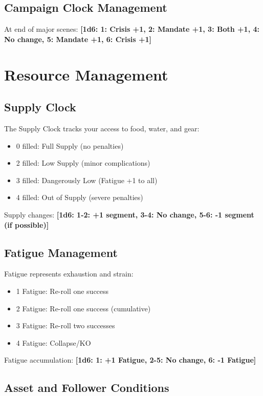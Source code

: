 \documentclass[11pt]{article}
\newcommand{\dice}[1]{\textbf{[1d6: #1]}}
\begin{document}
\subsection{Campaign Clock Management}

At end of major scenes:
\dice{1: Crisis +1, 2: Mandate +1, 3: Both +1, 4: No change, 5: Mandate +1, 6: Crisis +1}

\section{Resource Management}

\subsection{Supply Clock}

The Supply Clock tracks your access to food, water, and gear:
\begin{itemize}
    \item 0 filled: Full Supply (no penalties)
    \item 2 filled: Low Supply (minor complications)
    \item 3 filled: Dangerously Low (Fatigue +1 to all)
    \item 4 filled: Out of Supply (severe penalties)
\end{itemize}

Supply changes:
\dice{1-2: +1 segment, 3-4: No change, 5-6: -1 segment (if possible)}

\subsection{Fatigue Management}

Fatigue represents exhaustion and strain:
\begin{itemize}
    \item 1 Fatigue: Re-roll one success
    \item 2 Fatigue: Re-roll one success (cumulative)
    \item 3 Fatigue: Re-roll two successes
    \item 4 Fatigue: Collapse/KO
\end{itemize}

Fatigue accumulation:
\dice{1: +1 Fatigue, 2-5: No change, 6: -1 Fatigue}

\subsection{Asset and Follower Conditions}
\end{document}
